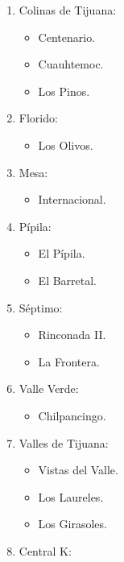 \documentclass[]{article}
\providecommand{\tightlist}{%
  \setlength{\itemsep}{0pt}\setlength{\parskip}{0pt}}
\begin{document}
\begin{enumerate}
\def\labelenumi{\arabic{enumi}.}
\tightlist
\item
  Colinas de Tijuana:

  \begin{itemize}
  \tightlist
  \item
    Centenario.
  \item
    Cuauhtemoc.
  \item
    Los Pinos.
  \end{itemize}
\item
  Florido:

  \begin{itemize}
  \tightlist
  \item
    Los Olivos.
  \end{itemize}
\item
  Mesa:

  \begin{itemize}
  \tightlist
  \item
    Internacional.
  \end{itemize}
\item
  Pípila:

  \begin{itemize}
  \tightlist
  \item
    El Pípila.
  \item
    El Barretal.
  \end{itemize}
\item
  Séptimo:

  \begin{itemize}
  \tightlist
  \item
    Rinconada II.
  \item
    La Frontera.
  \end{itemize}
\item
  Valle Verde:

  \begin{itemize}
  \tightlist
  \item
    Chilpancingo.
  \end{itemize}
\item
  Valles de Tijuana:

  \begin{itemize}
  \tightlist
  \item
    Vistas del Valle.
  \item
    Los Laureles.
  \item
    Los Girasoles.
  \end{itemize}
\item
  Central K:


\end{enumerate}
\end{document}
